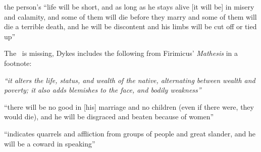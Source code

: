 \begin{description}[style=multiline,leftmargin=1.5cm]
\item[\Mars\Opposition\Moon] the person's ``life will be short, and as long as he stays alive [it will be] in misery and calamity, and some of them will die before they marry and some of them will die a terrible death, and he will be discontent and his limbs will be cut off or tied up''

\begin{mdframed}[backgroundcolor=cyan!5, rightmargin=1em, leftmargin=1em]
The \Sun\Opposition\Moon\, is missing, Dykes includes the following from Firimicus' \textsl{Mathesis} in a footnote: 
\end{mdframed}

\item[\Sun\Opposition\Moon] 
\textsl{``it alters the life, status, and wealth of the native, alternating between wealth and poverty; it also adds blemishes to the face, and bodily weakness''}

\item[\Venus\Opposition\Moon] ``there will be no good in [his] marriage and no children (even if there were, they would die), and he will be disgraced and beaten because of women''

\item[\Mercury\Opposition\Moon] ``indicates quarrels and affliction from groups of people and great slander, and he will be a coward in speaking''
\end{description}

